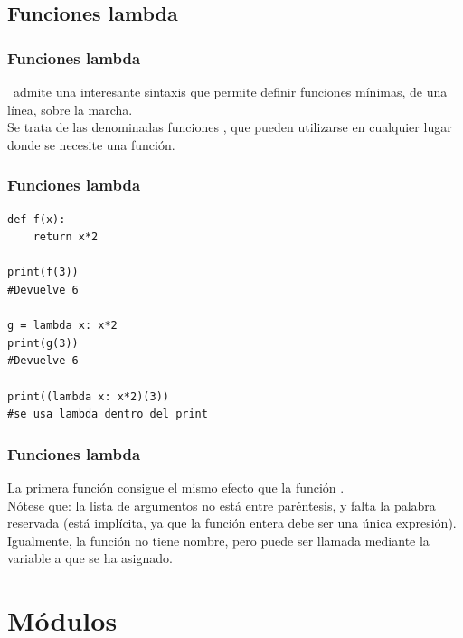 \subsection{Funciones lambda}
\begin{frame}
\frametitle{Funciones lambda}
\python\ admite una interesante sintaxis que permite definir funciones mínimas, de una línea, sobre la marcha. 
\\
\bigskip
Se trata de las denominadas funciones , que pueden utilizarse en cualquier lugar donde se necesite una función.
\end{frame}
\begin{frame}
\frametitle{Funciones lambda}
\begin{lstlisting}[caption=Ejemplo de función lambda,basicstyle=\linespread{1.2}\ttfamily\small, columns=fullflexible,escapeinside=||]
def f(x):
	return x*2

print(f(3))
#Devuelve 6

g = lambda x: x*2
print(g(3))
#Devuelve 6

print((lambda x: x*2)(3))
#se usa lambda dentro del print
\end{lstlisting}
\end{frame}
\begin{frame}
\frametitle{Funciones lambda}
La primera función  consigue el mismo efecto que la función .
\\
\bigskip
Nótese que: la lista de argumentos no está entre paréntesis, y falta la palabra reservada  (está implícita, ya que la función entera debe ser una única expresión). 
\\
\bigskip
Igualmente, la función no tiene nombre, pero puede ser llamada mediante la variable a que se ha asignado.
\end{frame}
\section{Módulos}
